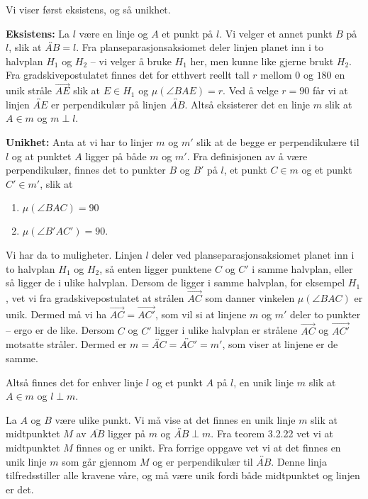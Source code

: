 \begin{oppgave}[3.5.2]
    Vi viser først eksistens, og så unikhet. 

    \textbf{Eksistens:} La $l$ være en linje og $A$ et punkt på $l$. Vi velger et annet punkt $B$ på 
    $l$, slik at $\overleftrightarrow{AB}=l$. Fra planseparasjonsaksiomet deler linjen planet inn i to 
    halvplan $H_1$ og $H_2$ -- vi velger å bruke $H_1$ her, men kunne like gjerne 
    brukt $H_2$. Fra gradskivepostulatet finnes det for etthvert reellt tall $r$ mellom $0$ og $180$
    en unik stråle $\overrightarrow{AE}$ slik at $E\in H_1$ og $\mu(\angle BAE)=r$. Ved å velge 
    $r =  90$ får vi at linjen $\overleftrightarrow{AE}$ er perpendikulær på linjen 
    $\overleftrightarrow{AB}$. Altså eksisterer det en linje $m$ slik at $A\in m$ og $m\perp l$. 

    \textbf{Unikhet:} Anta at vi har to linjer $m$ og $m'$ slik at de begge er perpendikulære til $l$ og
    at punktet $A$ ligger på både $m$ og $m'$. Fra definisjonen av å være perpendikulær, finnes det to 
    punkter $B$ og $B'$ på $l$, et punkt $C\in m$ og et punkt $C'\in m'$, slik at 
    \begin{enumerate}[label=\arabic*)]
        \item $\mu(\angle BAC)=90$
        \item $\mu(\angle B'AC')=90$.
    \end{enumerate}
    Vi har da to muligheter. Linjen $l$ deler ved planseparasjonsaksiomet planet inn i to halvplan 
    $H_1$ og $H_2$, så enten ligger punktene $C$ og $C'$ i samme halvplan, eller så ligger de i 
    ulike halvplan. Dersom de ligger i samme halvplan, for eksempel $H_1$, vet vi fra 
    gradskivepostulatet at strålen $\overrightarrow{AC}$ som danner vinkelen $\mu(\angle BAC)$ er unik. 
    Dermed må vi ha $\overrightarrow{AC}=\overrightarrow{AC'}$, som vil si at linjene $m$ og $m'$ deler
    to punkter -- ergo er de like. Dersom $C$ og $C'$ ligger i ulike halvplan er strålene 
    $\overrightarrow{AC}$ og $\overrightarrow{AC'}$ motsatte stråler. Dermed er 
    $m=\overleftrightarrow{AC}=\overleftrightarrow{AC'}=m'$, som viser at linjene er de samme. 
    
    Altså finnes det for enhver linje $l$ og et punkt $A$ på $l$, en unik linje $m$ slik at $A\in m$ og 
    $l\perp m$.  
\end{oppgave}

\begin{oppgave}[3.5.3]
    La $A$ og $B$ være ulike punkt. Vi må vise at det finnes en unik linje $m$ slik at midtpunktet $M$ av 
    $\overline{AB}$ ligger på $m$ og $\overleftrightarrow{AB}\perp m$. Fra teorem 3.2.22 vet vi at 
    midtpunktet $M$ finnes og er unikt. Fra forrige oppgave vet vi at det finnes en unik linje $m$ som 
    går gjennom $M$ og er perpendikulær til $\overleftrightarrow{AB}$. Denne linja tilfredsstiller alle
    kravene våre, og må være unik fordi både midtpunktet og linjen er det. 
\end{oppgave}

